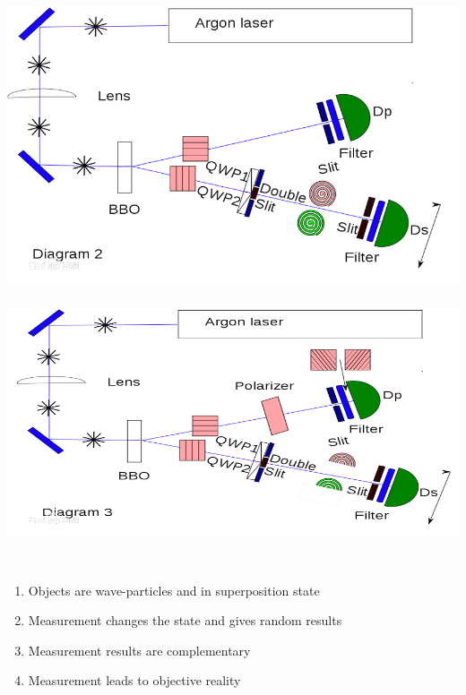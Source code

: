\begin{frame}
    \frametitle{}
    \begin{center}
        \includegraphics[width=1.0\textwidth]{figs/chachuexp_2.png} \\
    \end{center} 
\end{frame}

\begin{frame}
    \frametitle{}
    \begin{center}
        \includegraphics[width=1.0\textwidth]{figs/chachuexp_3.png} \\
    \end{center} 
\end{frame}

\begin{frame}
    \begin{tcolorbox4}[Conclusion]
        ~~\\
    \begin{enumerate}
        \item Objects are wave-particles and in superposition state
        \item Measurement changes the state and gives random results
        \item Measurement results are complementary
        \item Measurement leads to objective reality
    \end{enumerate}
    \end{tcolorbox4}
\end{frame}

\begin{frame}
    \frametitle{}
    \centering
\end{frame}
